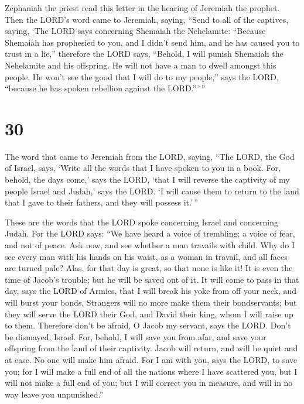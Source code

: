  Zephaniah the priest read this letter in the hearing of
Jeremiah the prophet.  Then the LORD's word came to
Jeremiah, saying,  ``Send to all of the captives, saying,
`The LORD says concerning Shemaiah the Nehelamite: ``Because Shemaiah
has prophesied to you, and I didn't send him, and he has caused you to
trust in a lie,''  therefore the LORD says, ``Behold, I
will punish Shemaiah the Nehelamite and his offspring. He will not have
a man to dwell amongst this people. He won't see the good that I will do
to my people,'' says the LORD, ``because he has spoken rebellion against
the LORD.''\,'\,''

\hypertarget{section-29}{%
\section{30}\label{section-29}}

 The word that came to Jeremiah from the LORD, saying,
 ``The LORD, the God of Israel, says, `Write all the words
that I have spoken to you in a book.  For, behold, the days
come,' says the LORD, `that I will reverse the captivity of my people
Israel and Judah,' says the LORD. `I will cause them to return to the
land that I gave to their fathers, and they will possess it.'\,''

 These are the words that the LORD spoke concerning Israel
and concerning Judah.  For the LORD says: ``We have heard a
voice of trembling; a voice of fear, and not of peace.  Ask
now, and see whether a man travails with child. Why do I see every man
with his hands on his waist, as a woman in travail, and all faces are
turned pale?  Alas, for that day is great, so that none is
like it! It is even the time of Jacob's trouble; but he will be saved
out of it.  It will come to pass in that day, says the LORD
of Armies, that I will break his yoke from off your neck, and will burst
your bonds. Strangers will no more make them their bondservants;
 but they will serve the LORD their God, and David their
king, whom I will raise up to them.  Therefore don't be
afraid, O Jacob my servant, says the LORD. Don't be dismayed, Israel.
For, behold, I will save you from afar, and save your offspring from the
land of their captivity. Jacob will return, and will be quiet and at
ease. No one will make him afraid.  For I am with you, says
the LORD, to save you; for I will make a full end of all the nations
where I have scattered you, but I will not make a full end of you; but I
will correct you in measure, and will in no way leave you unpunished.''

